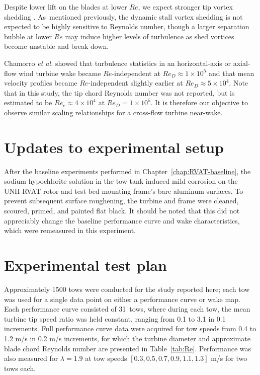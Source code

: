 Despite lower lift on the blades at lower $Re$, we expect stronger tip vortex
shedding \cite{Yoon2005}. As~mentioned previously, the dynamic stall vortex
shedding is not expected to be highly sensitive to Reynolds number, though a
larger separation bubble at lower $Re$ may induce higher levels of turbulence as
shed vortices become unstable and break down.

Chamorro \emph{et al.} \cite{Chamorro2012} showed that turbulence statistics in
an horizontal-axis or axial-flow wind turbine wake became $Re$-independent at
$Re_D \approx 1 \times 10^5$ and that mean velocity profiles became
$Re$-independent slightly earlier at $Re_D \approx 5 \times 10^4$. Note that in
this study, the tip chord Reynolds number was not reported, but is estimated to
be $Re_c \approx 4 \times 10^4$ at $Re_D=1 \times 10^5$. It is therefore our
objective to observe similar scaling relationships for a cross-flow turbine
near-wake.


\section{Updates to experimental setup}

After the baseline experiments performed in Chapter~\ref{chap:RVAT-baseline},
the sodium hypochlorite solution in the tow tank induced mild corrosion on the
UNH-RVAT rotor and test bed mounting frame's bare aluminum surfaces. To prevent
subsequent surface roughening, the turbine and frame were cleaned, scoured,
primed, and painted flat black. It should be noted that this did not appreciably
change the baseline performance curve and wake characteristics, which were
remeasured in this experiment.


\section{Experimental test plan}

Approximately 1500 tows were conducted for the study reported here; each tow was
used for a single data point on either a performance curve or wake map. Each
performance curve consisted of 31~tows, where during each tow, the mean turbine
tip speed ratio was held constant, ranging from 0.1 to 3.1 in 0.1 increments.
Full performance curve data were acquired for tow speeds from 0.4 to 1.2 m/s in
0.2 m/s increments, for which the turbine diameter and approximate blade chord
Reynolds number are presented in Table~\ref{tab:Re}. Performance was also
measured for $\lambda=1.9$ at tow speeds $[0.3, 0.5, 0.7, 0.9, 1.1, 1.3]$ m/s
for two tows each.


